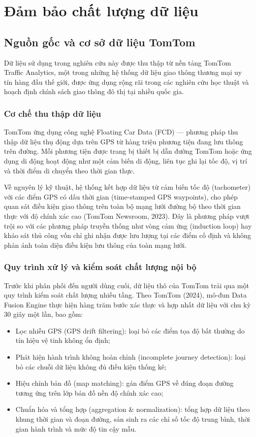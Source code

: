 \section{Đảm bảo chất lượng dữ liệu}
\subsection{Nguồn gốc và cơ sở dữ liệu TomTom}
Dữ liệu sử dụng trong nghiên cứu này được thu thập từ nền tảng TomTom Traffic Analytics, một trong những hệ thống dữ liệu giao thông thương mại uy tín hàng đầu thế giới, được ứng dụng rộng rãi trong các nghiên cứu học thuật và hoạch định chính sách giao thông đô thị tại nhiều quốc gia.

\subsubsection{Cơ chế thu thập dữ liệu}
TomTom ứng dụng công nghệ Floating Car Data (FCD) --- phương pháp thu thập dữ liệu thụ động dựa trên GPS từ hàng triệu phương tiện đang lưu thông trên đường. Mỗi phương tiện được trang bị thiết bị dẫn đường TomTom hoặc ứng dụng di động hoạt động như một cảm biến di động, liên tục ghi lại tốc độ, vị trí và thời điểm di chuyển theo thời gian thực.

Về nguyên lý kỹ thuật, hệ thống kết hợp dữ liệu từ cảm biến tốc độ (tachometer) với các điểm GPS có dấu thời gian (time-stamped GPS waypoints), cho phép quan sát điều kiện giao thông trên toàn bộ mạng lưới đường bộ theo thời gian thực với độ chính xác cao (TomTom Newsroom, 2023). Đây là phương pháp vượt trội so với các phương pháp truyền thống như vòng cảm ứng (induction loop) hay khảo sát thủ công vốn chỉ ghi nhận được lưu lượng tại các điểm cố định và không phản ánh toàn diện điều kiện lưu thông của toàn mạng lưới.

\subsubsection{Quy trình xử lý và kiểm soát chất lượng nội bộ}
Trước khi phân phối đến người dùng cuối, dữ liệu thô của TomTom trải qua một quy trình kiểm soát chất lượng nhiều tầng. Theo TomTom (2024), mô-đun Data Fusion Engine thực hiện hàng trăm bước xác thực và hợp nhất dữ liệu với chu kỳ 30 giây một lần, bao gồm:
\begin{itemize}
    \item Lọc nhiễu GPS (GPS drift filtering): loại bỏ các điểm tọa độ bất thường do tín hiệu vệ tinh không ổn định;
    \item Phát hiện hành trình không hoàn chỉnh (incomplete journey detection): loại bỏ các chuỗi dữ liệu không đủ điều kiện thống kê;
    \item Hiệu chỉnh bản đồ (map matching): gán điểm GPS về đúng đoạn đường tương ứng trên lớp bản đồ nền độ chính xác cao;
    \item Chuẩn hóa và tổng hợp (aggregation \& normalization): tổng hợp dữ liệu theo khung thời gian và đoạn đường, sản sinh ra các chỉ số tốc độ trung bình, thời gian hành trình và mức độ tin cậy mẫu.
\end{itemize}

